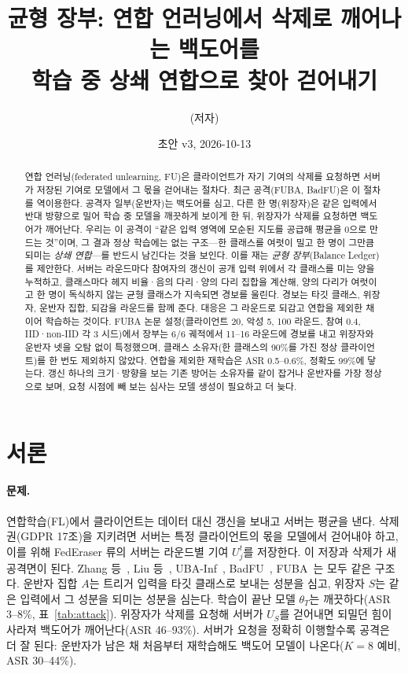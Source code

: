 \documentclass[10pt,a4paper]{article}
\title{균형 장부: 연합 언러닝에서 삭제로 깨어나는 백도어를\\학습 중 상쇄 연합으로 찾아 걷어내기}
\author{(저자)}
\date{초안 v3, 2026-10-13}
\begin{document}
\maketitle

\begin{abstract}
연합 언러닝(federated unlearning, FU)은 클라이언트가 자기 기여의 삭제를 요청하면 서버가 저장된 기여로 모델에서 그 몫을 걷어내는 절차다. 최근 공격(FUBA, BadFU)은 이 절차를 역이용한다. 공격자 일부(운반자)는 백도어를 심고, 다른 한 명(위장자)은 같은 입력에서 반대 방향으로 밀어 학습 중 모델을 깨끗하게 보이게 한 뒤, 위장자가 삭제를 요청하면 백도어가 깨어난다. 우리는 이 공격이 ``같은 입력 영역에 모순된 지도를 공급해 평균을 0으로 만드는 것''이며, 그 결과 정상 학습에는 없는 구조---한 클래스를 여럿이 밀고 한 명이 그만큼 되미는 \emph{상쇄 연합}---를 반드시 남긴다는 것을 보인다. 이를 재는 \emph{균형 장부}(Balance Ledger)를 제안한다. 서버는 라운드마다 참여자의 갱신이 공개 입력 위에서 각 클래스를 미는 양을 누적하고, 클래스마다 헤지 비율·음의 다리·양의 다리 집합을 계산해, 양의 다리가 여럿이고 한 명이 독식하지 않는 균형 클래스가 지속되면 경보를 울린다. 경보는 타깃 클래스, 위장자, 운반자 집합, 되감을 라운드를 함께 준다. 대응은 그 라운드로 되감고 연합을 제외한 채 이어 학습하는 것이다. FUBA 논문 설정(클라이언트 20, 악성 5, 100 라운드, 참여 0.4, IID·non-IID 각 3 시드)에서 장부는 6/6 궤적에서 11--16 라운드에 경보를 내고 위장자와 운반자 넷을 오탐 없이 특정했으며, 클래스 소유자(한 클래스의 90\%를 가진 정상 클라이언트)를 한 번도 제외하지 않았다. 연합을 제외한 재학습은 ASR 0.5--0.6\%, 정확도 99\%에 닿는다. 갱신 하나의 크기·방향을 보는 기존 방어는 소유자를 같이 잡거나 운반자를 가장 정상으로 보며, 요청 시점에 빼 보는 심사는 모델 생성이 필요하고 더 늦다.
\end{abstract}

\section{서론}
\paragraph{문제.}
연합학습(FL)에서 클라이언트는 데이터 대신 갱신을 보내고 서버는 평균을 낸다. 삭제권(GDPR 17조)을 지키려면 서버는 특정 클라이언트의 몫을 모델에서 걷어내야 하고, 이를 위해 FedEraser 류의 서버는 라운드별 기여 $U_j^t$를 저장한다. 이 저장과 삭제가 새 공격면이 된다. Zhang 등~\cite{zhang2023}, Liu 등~\cite{liu2024}, UBA-Inf~\cite{ubainf}, BadFU~\cite{badfu}, FUBA~\cite{fuba}는 모두 같은 구조다. 운반자 집합 $A$는 트리거 입력을 타깃 클래스로 보내는 성분을 심고, 위장자 $S$는 같은 입력에서 그 성분을 되미는 성분을 심는다. 학습이 끝난 모델 $\theta_T$는 깨끗하다(ASR 3--8\%, 표~\ref{tab:attack}). 위장자가 삭제를 요청해 서버가 $U_S$를 걷어내면 되밀던 힘이 사라져 백도어가 깨어난다(ASR 46--93\%). 서버가 요청을 정확히 이행할수록 공격은 더 잘 된다: 운반자가 남은 채 처음부터 재학습해도 백도어 모델이 나온다($K=8$ 예비, ASR 30--44\%).
\end{document}
